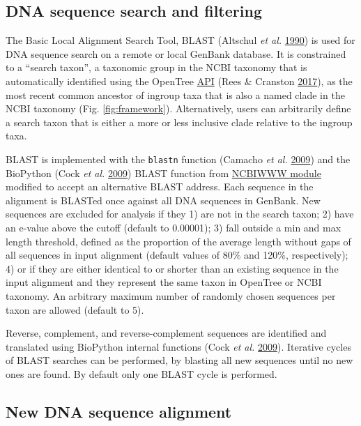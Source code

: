 \documentclass[]{article}
\begin{document}
\hypertarget{dna-sequence-search-and-filtering}{%
\subsection{DNA sequence search and filtering}\label{dna-sequence-search-and-filtering}}

The Basic Local Alignment Search Tool, BLAST (Altschul \emph{et al.} \protect\hyperlink{ref-altschul1990basic}{1990}) is used for DNA sequence search on a remote or local GenBank database. It is constrained to a ``search taxon'', a taxonomic group in the NCBI taxonomy that is automatically identified using the OpenTree \href{https://github.com/OpenTreeOfLife/germinator/wiki/Taxonomy-API-v3\#mrca}{API} (Rees \& Cranston \protect\hyperlink{ref-rees2017automated}{2017}), as the most recent common ancestor of ingroup taxa that is also a named clade in the NCBI taxonomy (Fig. \ref{fig:framework}).
Alternatively, users can arbitrarily define a search taxon that is either a more or less inclusive clade relative to the ingroup taxa.

BLAST is implemented with the \texttt{blastn} function (Camacho \emph{et al.} \protect\hyperlink{ref-camacho2009blast}{2009}) and the BioPython (Cock \emph{et al.} \protect\hyperlink{ref-cock2009biopython}{2009}) BLAST function from \href{https://biopython.org/DIST/docs/api/Bio.Blast.NCBIWWW-module.html}{NCBIWWW module} modified to accept an alternative BLAST address.
Each sequence in the alignment is BLASTed once against all DNA sequences in GenBank.
New sequences are excluded for analysis if they 1) are not in the search taxon; 2) have an e-value above the cutoff (default to 0.00001); 3) fall outside a min and max length threshold, defined as the proportion of the average length without gaps of all sequences in input alignment (default values of 80\% and 120\%, respectively); 4) or if they are either identical to or shorter than an existing sequence in the input alignment and they represent the same taxon in OpenTree or NCBI taxonomy.
An arbitrary maximum number of randomly chosen sequences per taxon are allowed (default to 5).

Reverse, complement, and reverse-complement sequences are identified and translated using BioPython internal functions (Cock \emph{et al.} \protect\hyperlink{ref-cock2009biopython}{2009}).
Iterative cycles of BLAST searches can be performed, by blasting all new sequences until no new ones are found. By default only one BLAST cycle is performed.

\hypertarget{new-dna-sequence-alignment}{%
\subsection{New DNA sequence alignment}\label{new-dna-sequence-alignment}}
\end{document}
